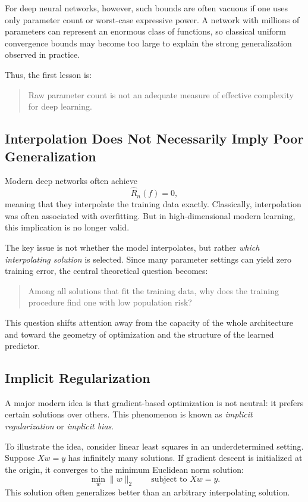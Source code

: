 For deep neural networks, however, such bounds are often vacuous if one uses only parameter count or worst-case expressive power. A network with millions of parameters can represent an enormous class of functions, so classical uniform convergence bounds may become too large to explain the strong generalization observed in practice.

Thus, the first lesson is:

\begin{quote}
Raw parameter count is not an adequate measure of effective complexity for deep learning.
\end{quote}

\subsection{Interpolation Does Not Necessarily Imply Poor Generalization}

Modern deep networks often achieve
\[
\hat{R}_n(f)=0,
\]
meaning that they interpolate the training data exactly. Classically, interpolation was often associated with overfitting. But in high-dimensional modern learning, this implication is no longer valid.

The key issue is not whether the model interpolates, but rather \emph{which interpolating solution} is selected. Since many parameter settings can yield zero training error, the central theoretical question becomes:

\begin{quote}
Among all solutions that fit the training data, why does the training procedure find one with low population risk?
\end{quote}

This question shifts attention away from the capacity of the whole architecture and toward the geometry of optimization and the structure of the learned predictor.

\subsection{Implicit Regularization}

A major modern idea is that gradient-based optimization is not neutral: it prefers certain solutions over others. This phenomenon is known as \emph{implicit regularization} or \emph{implicit bias}.

To illustrate the idea, consider linear least squares in an underdetermined setting. Suppose \( Xw=y \) has infinitely many solutions. If gradient descent is initialized at the origin, it converges to the minimum Euclidean norm solution:
\[
\min_w \|w\|_2 \qquad \text{subject to } Xw=y.
\]
This solution often generalizes better than an arbitrary interpolating solution.


